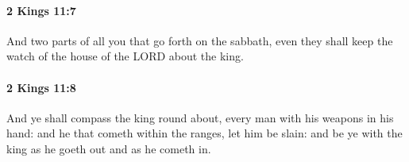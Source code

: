 		\paragraph{2 Kings 11:7} %
			\label{2KINGS-11-7}

			And two parts of all you that go forth on the sabbath, even they shall keep the watch of the house of the LORD about the king.


		\paragraph{2 Kings 11:8} %
			\label{2KINGS-11-8}

			And ye shall compass the king round about, every man with his weapons in his hand: and he that cometh within the ranges, let him be slain: and be ye with the king as he goeth out and as he cometh in.


